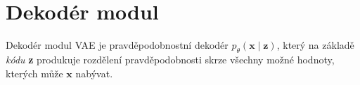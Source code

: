 \section{Dekodér modul}
\label{sec:vae_decoder}
Dekodér modul VAE je pravděpodobnostní dekodér $p_\theta(\textbf{x}\mid\textbf{z})$,
který na základě \emph{kódu} \textbf{z} produkuje rozdělení pravděpodobnosti skrze všechny možné hodnoty, kterých může $\textbf{x}$ nabývat. \cite{Kingma2014}